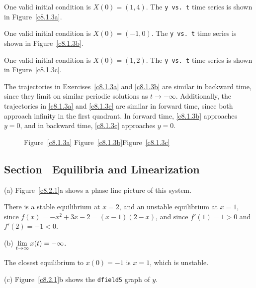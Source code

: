 \documentclass{ximera}
\begin{document}
One valid initial condition is $X(0) = (1,4)$.  The {\tt y vs.\ t}
time series is shown in Figure~\ref{c8.1.3a}.

One valid initial condition is $X(0) = (-1,0)$.  The {\tt y vs.\ t}
time series is shown in Figure~\ref{c8.1.3b}.

\newpage
{} One valid initial condition is $X(0) = (1,2)$.  The
{\tt y vs.\ t} time series is shown in Figure~\ref{c8.1.3c}.

\para The trajectories in Exercises~\ref{c8.1.3a} and \ref{c8.1.3b} are
similar in backward time, since they limit on similar periodic
solutions as $t \rightarrow -\infty$.  Additionally, the trajectories
in \ref{c8.1.3a} and \ref{c8.1.3c} are similar in forward time, since
both approach infinity in the first quadrant.  In forward time,
\ref{c8.1.3b} approaches $y = 0$, and in backward time, \ref{c8.1.3c}
approaches $y = 0$.

\begin{figure}[htb]
                       \centerline{%
                       }
		\centerline{Figure~\ref{c8.1.3a}\hspace{1.2in}
Figure~\ref{c8.1.3b}\hspace{1.2in}Figure~\ref{c8.1.3c}}
\end{figure}



\subsection*{Section~\protect{\ref{S:linearization}} Equilibria and Linearization}

(a) \ans Figure~\ref{c8.2.1}a shows a phase line picture
of this system.

\soln There is a stable equilibrium at $x = 2$, and an unstable
equilibrium at $x = 1$, since $f(x) = -x^2 + 3x - 2 = (x - 1)(2 - x)$,
and since $f'(1) = 1 > 0$ and $f'(2) = -1 < 0$.

(b) \ans $\displaystyle\lim_{t \to \infty} x(t) = -\infty$.

\soln The closest equilibrium to $x(0) = -1$ is $x = 1$, which is
unstable. 

(c) \ans Figure~\ref{c8.2.1}b shows the {\tt dfield5} graph of $y$.
\end{document}
